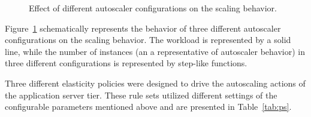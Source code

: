

\begin{figure}[htb]
	\centering
	\caption{Effect of different autoscaler configurations on the scaling behavior.}  
	\label{fig:different-autoscaler-configuration}
\end{figure}
Figure~\ref{fig:different-autoscaler-configuration} schematically represents the behavior of three different autoscaler configurations on the scaling behavior. The workload is represented by a solid line, while the number of instances (an a representative of autoscaler behavior) in three different configurations is represented by step-like functions. 




Three different elasticity policies were designed to drive the autoscaling actions of the application server tier. 
These rule sets utilized different settings of the configurable parameters mentioned above and are presented in Table~\ref{tab:ps}.  


